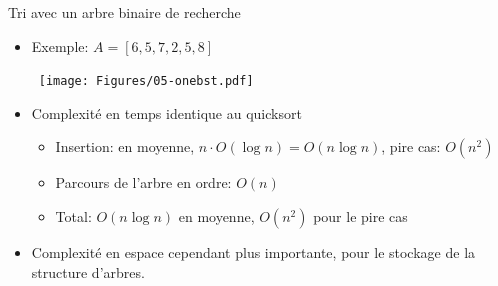 \begin{frame}{Tri avec un arbre binaire de recherche}

\begin{center}
\begin{small}
\end{small}
\end{center}

\begin{itemize}
\item Exemple: $A=[6,5,7,2,5,8]$

~\hfill\texttt{[image: Figures/05-onebst.pdf]}
\item Complexité en temps identique au quicksort
\begin{itemize}
\item Insertion: en moyenne, $n\cdot O(\log n)=O(n\log n)$, pire cas: $O(n^2)$
\item Parcours de l'arbre en ordre: $O(n)$
\item Total: $O(n\log n)$ en moyenne, $O(n^2)$ pour le pire cas
\end{itemize}
\item Complexité en espace cependant plus importante, pour le stockage de la structure d'arbres.
\end{itemize}

\end{frame}


